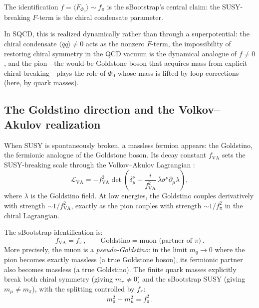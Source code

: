 \documentclass[12pt,a4paper]{article}
\newcommand{\qqbar}{\langle\bar{q}q\rangle}
\begin{document}
The identification $f = \langle F_{\Phi_0}\rangle \sim f_\pi$ is the 
sBootstrap's central claim: the SUSY-breaking $F$-term is the chiral 
condensate parameter.

In SQCD, this is realized dynamically rather than through a 
superpotential: the chiral condensate $\qqbar \neq 0$ acts as the 
nonzero $F$-term, the impossibility of restoring chiral symmetry 
in the QCD vacuum is the dynamical analogue of $f \neq 0$, and the 
pion---the would-be Goldstone boson that acquires mass from explicit 
chiral breaking---plays the role of $\Phi_0$ whose mass is lifted 
by loop corrections (here, by quark masses).

\subsection{The Goldstino direction and the Volkov--Akulov realization}
\label{subsec:va}

When SUSY is spontaneously broken, a massless fermion appears: the 
Goldstino, the fermionic analogue of the Goldstone boson. Its decay 
constant $f_{\text{VA}}$ sets the SUSY-breaking scale through the 
Volkov--Akulov Lagrangian \cite{VolkovAkulov1973}:
\begin{equation}
\mathcal{L}_{\text{VA}} = -f_{\text{VA}}^2 \det\!\left(
\delta_\mu^\nu + \frac{i}{f_{\text{VA}}^2}\,\bar{\lambda}\bar{\sigma}^\nu
\partial_\mu\lambda\right),
\end{equation}
where $\lambda$ is the Goldstino field. At low energies, the Goldstino 
couples derivatively with strength $\sim 1/f_{\text{VA}}^2$, exactly 
as the pion couples with strength $\sim 1/f_\pi^2$ in the chiral 
Lagrangian.

The sBootstrap identification is:
\begin{equation}
\label{eq:va_id}
f_{\text{VA}} = f_\pi\,, \qquad 
\text{Goldstino} = \text{muon (partner of }\pi\text{)}\,.
\end{equation}
More precisely, the muon is a \emph{pseudo-Goldstino}: in the 
limit $m_q \to 0$ where the pion becomes exactly massless (a true 
Goldstone boson), its fermionic partner also becomes massless (a 
true Goldstino). The finite quark masses explicitly break both 
chiral symmetry (giving $m_\pi \neq 0$) and the sBootstrap SUSY 
(giving $m_\mu \neq m_\pi$), with the splitting controlled by 
$f_\pi$:
\begin{equation}
m_\pi^2 - m_\mu^2 = f_\pi^2\,.
\end{equation}
\end{document}
